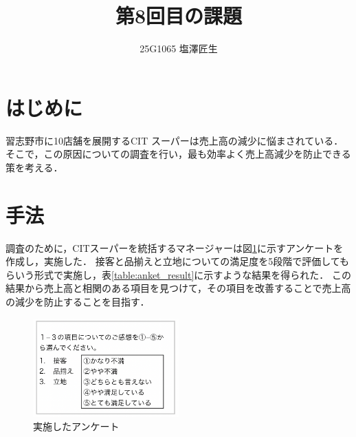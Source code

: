 \documentclass[uplatex]{jsarticle}
\begin{document}
\title{第8回目の課題}
\author{25G1065 塩澤匠生}
\maketitle


\section{はじめに}
習志野市に10店舗を展開するCIT スーパーは売上高の減少に悩まされている．
そこで，この原因についての調査を行い，最も効率よく売上高減少を防止できる策を考える．


\section{手法}
調査のために，CITスーパーを統括するマネージャーは図\ref{fig:anket}に示すアンケートを作成し，実施した．
接客と品揃えと立地についての満足度を5段階で評価してもらいう形式で実施し，表\ref{table:anket_result}に示すような結果を得られた．
この結果から売上高と相関のある項目を見つけて，その項目を改善することで売上高の減少を防止することを目指す．



\begin{figure}[H]
    \centering
    \includegraphics[width=0.5\textwidth]{anket.png}
    \caption{実施したアンケート}
    \label{fig:anket}
\end{figure}
\end{document}
